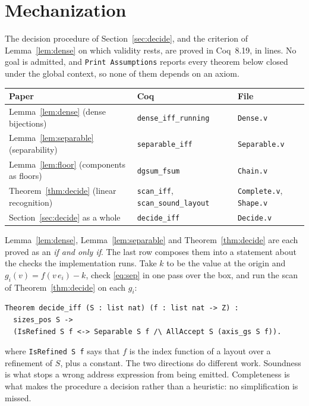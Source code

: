 \section{Mechanization}\label{sec:mech}

The decision procedure of Section~\ref{sec:decide}, and the criterion of
Lemma~\ref{lem:dense} on which validity rests, are proved in Coq~8.19, in
\evalCoqLines{} lines. No goal is admitted, and \texttt{Print Assumptions}
reports every theorem below closed under the global context, so none of them
depends on an axiom.

\begin{center}
\begin{tabular}{@{}lll@{}}
\toprule
Paper & Coq & File \\
\midrule
Lemma~\ref{lem:dense} (dense bijections) & \texttt{dense\_iff\_running} & \texttt{Dense.v} \\
Lemma~\ref{lem:separable} (separability) & \texttt{separable\_iff} & \texttt{Separable.v} \\
Lemma~\ref{lem:floor} (components as floors) & \texttt{dgsum\_fsum} & \texttt{Chain.v} \\
Theorem~\ref{thm:decide} (linear recognition) & \texttt{scan\_iff}, \texttt{scan\_sound\_layout} & \texttt{Complete.v}, \texttt{Shape.v} \\
Section~\ref{sec:decide} as a whole & \texttt{decide\_iff} & \texttt{Decide.v} \\
\bottomrule
\end{tabular}
\end{center}

Lemma~\ref{lem:dense}, Lemma~\ref{lem:separable} and Theorem~\ref{thm:decide}
are each proved as an \emph{if and only if}. The last row composes them into a
statement about the checks the implementation runs. Take $k$ to be the value
at the origin and $g_i(v) = f(v\,e_i) - k$, check \eqref{eq:sep} in one pass
over the box, and run the scan of Theorem~\ref{thm:decide} on each $g_i$:
\begin{lstlisting}
Theorem decide_iff (S : list nat) (f : list nat -> Z) :
  sizes_pos S ->
  (IsRefined S f <-> Separable S f /\ AllAccept S (axis_gs S f)).
\end{lstlisting}
where \texttt{IsRefined S f} says that $f$ is the index function of a layout
over a refinement of $S$, plus a constant. The two directions do different
work. Soundness is what stops a wrong address expression from being emitted.
Completeness is what makes the procedure a decision rather than a heuristic:
no simplification is missed.

